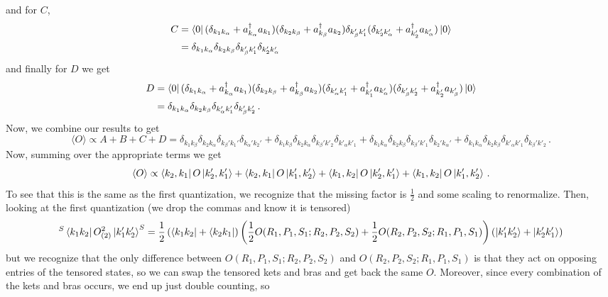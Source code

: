 \documentclass[10pt]{article}
\newcommand{\ak}[1]{a_{k_{#1}}}
\newcommand{\akp}[1]{a_{k_{#1}'}}
\begin{document}
and for $C$,
\begin{equation*}
  \begin{split}
    C & = \bra{0}(\delta_{k_{1}k_{\alpha}} + \ak{\alpha}^{\dagger}\ak{1})(\delta_{k_{2}k_{\beta}} + \ak{\beta}^{\dagger}\ak{2})\delta_{k_{\beta}'k'_{1}}(\delta_{k_{2}'k_{\alpha}'} + \akp{2}^{\dagger}\akp{\alpha})\ket{0} \\
    & = \delta_{k_{1}k_{\alpha}}\delta_{k_{2}k_{\beta}}\delta_{k_{\beta}'k'_{1}}\delta_{k_{2}'k_{\alpha}'} \\
  \end{split}
\end{equation*}
and finally for $D$ we get
\begin{equation*}
  \begin{split}
    D & = \bra{0}(\delta_{k_{1}k_{\alpha}} + \ak{\alpha}^{\dagger}\ak{1})(\delta_{k_{2}k_{\beta}} + \ak{\beta}^{\dagger}\ak{2})(\delta_{k'_{\alpha}k'_{1}} + \akp{1}^{\dagger}\akp{\alpha})(\delta_{k_{\beta}'k'_{2}} + \akp{2}^{\dagger}\akp{\beta})\ket{0} \\
    & = \delta_{k_{1}k_{\alpha}}\delta_{k_{2}k_{\beta}}\delta_{k'_{\alpha}k'_{1}}\delta_{k_{\beta}'k'_{2}} \, .\\
  \end{split}
\end{equation*}
Now, we combine our results to get
\[ \langle O\rangle \propto  A + B + C + D = \delta_{k_{1}k_{\beta}}\delta_{k_{2}k_{\alpha}}\delta_{k_{\beta}'k_{1}'}\delta_{k_{\alpha}'k_{2}'} + \delta_{k_{1}k_{\beta}}\delta_{k_{2}k_{\alpha}}\delta_{k_{\beta}'k'_{2}}\delta_{k'_{\alpha}k'_{1}} + \delta_{k_{1}k_{\alpha}}\delta_{k_{2}k_{\beta}}\delta_{k_{\beta}'k'_{1}}\delta_{k_{2}'k_{\alpha}'} + \delta_{k_{1}k_{\alpha}}\delta_{k_{2}k_{\beta}}\delta_{k'_{\alpha}k'_{1}}\delta_{k_{\beta}'k'_{2}} \, .\]
Now, summing over the appropriate terms we get
\[ \langle O \rangle \propto \bra{k_{2},k_{1}}O\ket{k_{2}',k_{1}'} + \bra{k_{2},k_{1}}O\ket{k_{1}',k_{2}'} + \bra{k_{1},k_{2}}O\ket{k_{2}',k_{1}'} + \bra{k_{1},k_{2}}O\ket{k_{1}',k_{2}'} \, .\]
To see that this is the same as the first quantization, we recognize that the missing factor is $\frac{1}{2}$ and some scaling to renormalize. Then, looking at the first quantization (we drop the commas and know it is tensored)
\[ {}^{S}\bra{k_{1}k_{2}}O^{2}_{(2)}\ket{k_{1}'k_{2}'}^{S} = \frac{1}{2}\left(\bra{k_{1}k_{2}} + \bra{k_{2}k_{1}}\right)\left(\frac{1}{2}O(R_{1},P_{1},S_{1};R_{2},P_{2},S_{2}) + \frac{1}{2}O(R_{2},P_{2},S_{2};R_{1},P_{1},S_{1})\right)\left(\ket{k_{1}'k_{2}'} + \ket{k_{2}'k_{1}'}\right) \]
but we recognize that the only difference between $O(R_{1},P_{1},S_{1};R_{2},P_{2},S_{2})$ and $O(R_{2},P_{2},S_{2};R_{1},P_{1},S_{1})$ is that they act on opposing entries of the tensored states, so we can swap the tensored kets and bras and get back the same $O$. Moreover, since every combination of the kets and bras occurs, we end up just double counting, so
\end{document}
